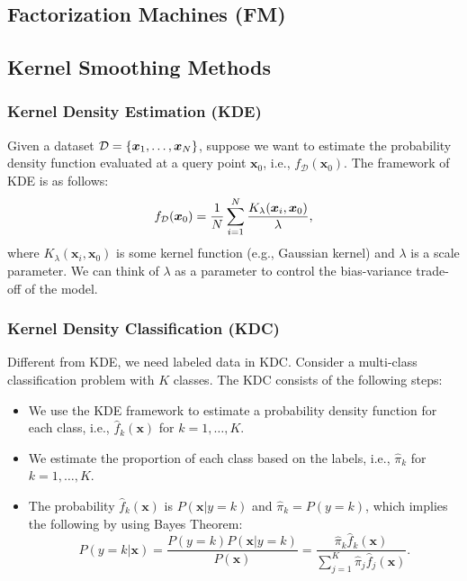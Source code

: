 {\subsection{Factorization Machines (FM)}
    
\subsection{Kernel Smoothing Methods}
    \subsubsection{Kernel Density Estimation (KDE)}
        Given a dataset $\mathcal{D}=\{ \bm{x}_1, \ldots, \bm{x}_N \}$, suppose we want to estimate the probability density function  evaluated at a query point $\bm{x}_0$, i.e., $f_\mathcal{D}(\bm{x}_0)$.
        The framework of KDE is as follows:
            \begin{equation}
                f_\mathcal{D}(\bm{x}_0) = \frac{1}{N}\sum_{i=1}^{N}{  \frac{K_\lambda(\bm{x}_i, \bm{x}_0)}{\lambda}   },
            \end{equation}
        where $K_\lambda(\bm{x}_i, \bm{x}_0)$ is some kernel function (e.g., Gaussian kernel) and $\lambda$ is a scale parameter.
        We can think of $\lambda$ as a parameter to control the bias-variance trade-off of the model.
        
    \subsubsection{Kernel Density Classification (KDC)}
        Different from KDE, we need labeled data in KDC.
        Consider a multi-class classification problem with $K$ classes.
        The KDC consists of the following steps:
            \begin{itemize}
                \item We use the KDE framework to estimate a probability density function for each class, i.e., $\hat{f}_k(\bm{x})$ for $k=1,\ldots, K$.
                \item We estimate the proportion of each class based on the labels, i.e., $\hat{\pi}_k$ for $k=1,\ldots, K$.
                \item The probability $\hat{f}_k(\bm{x})$ is $P(\bm{x} | y=k)$ and $\hat{\pi}_k = P(y=k)$, which implies the following by using Bayes Theorem:
                    \begin{equation}
                        P(y=k | \bm{x}) = \frac{P(y=k) P(\bm{x} | y=k)}{P(\bm{x})} = \frac{\hat{\pi}_k \hat{f}_k(\bm{x}) }{\sum_{j=1}^{K}{ \hat{\pi}_j \hat{f}_j(\bm{x})   }}.
                    \end{equation}
            \end{itemize}
            
}
